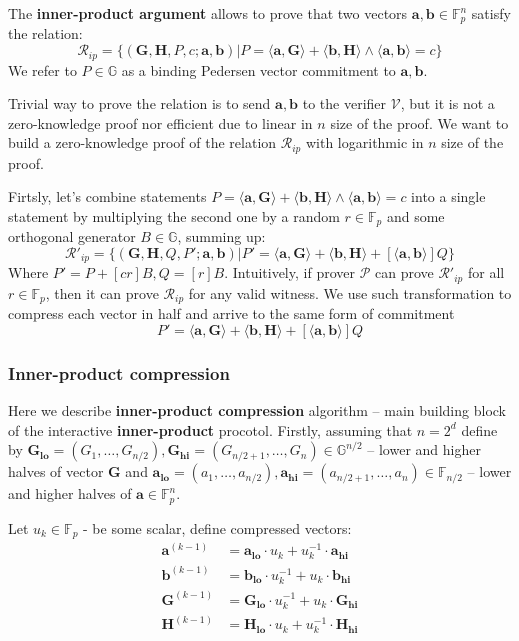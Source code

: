\documentclass[../lecture-notes-148x210.tex]{subfiles}
\begin{document}
The \textbf{inner-product argument} allows to prove that two vectors $\mathbf{a,b} \in \mathbb{F}_p^n$ satisfy the relation:
$$\mathcal{R}_{ip} = \{ (\mathbf{G,H}, P, c; \mathbf{a,b}) \vert P = \langle \mathbf{a,G} \rangle + \langle \mathbf{b,H} \rangle \wedge \langle \mathbf{a,b} \rangle = c \}$$
We refer to $P \in \mathbb{G}$ as a binding Pedersen vector commitment to $\mathbf{a,b}$.

Trivial way to prove the relation is to send $\mathbf{a,b}$ to the verifier $\mathcal{V}$, but it is not a zero-knowledge proof nor efficient due to linear in $n$ size of the proof. We want to build a zero-knowledge proof of the relation $\mathcal{R}_{ip}$ with logarithmic in $n$ size of the proof.

Firtsly, let's combine statements $P = \langle \mathbf{a,G} \rangle + \langle \mathbf{b,H} \rangle \wedge \langle \mathbf{a,b} \rangle = c$ into a single statement by multiplying the second one by a random $r \in \mathbb{F}_p$ and some orthogonal generator $B \in \mathbb{G}$, summing up:
$$
\mathcal{R}'_{ip} = \{ (\mathbf{G,H}, Q, P'; \mathbf{a,b}) \vert P' = \langle \mathbf{a,G} \rangle + \langle \mathbf{b,H} \rangle + [\langle \mathbf{a,b} \rangle]Q \}
$$
Where $P' = P + [cr]B, Q=[r]B$. Intuitively, if prover $\mathcal{P}$ can prove $\mathcal{R}'_{ip}$ for all $r \in \mathbb{F}_p$, then it can prove $\mathcal{R}_{ip}$ for any valid witness. We use such transformation to compress each vector in half and arrive to the same form of commitment
$$P' = \langle \mathbf{a,G} \rangle + \langle \mathbf{b,H} \rangle + [\langle \mathbf{a,b} \rangle]Q$$

\subsubsection{Inner-product compression}

Here we describe \textbf{inner-product compression} algorithm -- main building block of the interactive \textbf{inner-product} procotol.
Firstly, assuming that $n = 2^d$ define by $\mathbf{G_{lo}} = (G_1, \dots, G_{n/2}), \mathbf{G_{hi}} = (G_{n/2+1},\dots, G_n) \in \mathbb{G}^{n/2}$ -- lower and higher halves of vector $\mathbf{G}$ and $\mathbf{a_{lo}} = (a_1, \dots, a_{n/2}), \mathbf{a_{hi}} = (a_{n/2+1},\dots,a_n) \in \mathbb{F}_{n/2}$ -- lower and higher halves of $\mathbf{a} \in \mathbb{F}_p^{n}$.

Let $u_k \in \mathbb{F}_p$ - be some scalar, define compressed vectors:
\begin{align}
    \mathbf{a}^{(k-1)} &= \mathbf{a_{lo}} \cdot u_k + u_k^{-1} \cdot \mathbf{a_{hi}} \\
    \mathbf{b}^{(k-1)} &= \mathbf{b_{lo}} \cdot u_k^{-1} + u_k \cdot \mathbf{b_{hi}} \\
    \mathbf{G}^{(k-1)} &= \mathbf{G_{lo}} \cdot u_k^{-1} + u_k \cdot \mathbf{G_{hi}} \\
    \mathbf{H}^{(k-1)} &= \mathbf{H_{lo}} \cdot u_k + u_k^{-1} \cdot \mathbf{H_{hi}}
\end{align}
\end{document}
